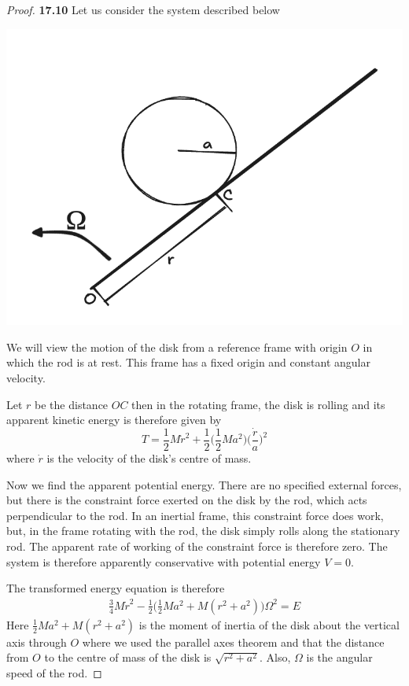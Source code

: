 \documentclass[11pt]{article}
\theoremstyle{definition}
\begin{document}
\begin{proof}{\textbf{17.10}}
    Let us consider the system described below
    \begin{center}
        \includegraphics[scale=0.4]{ch17-10.png}
    \end{center}
    We will view the motion of the disk from a reference frame with origin
    $O$ in which the rod is at rest.
    This frame has a fixed origin and constant angular velocity.
    
    Let $r$ be the distance $OC$ then in the rotating frame, the
    disk is rolling and its apparent kinetic energy is therefore 
    given by
    $$T = \frac{1}{2}M\dot r^2
    + \frac{1}{2}\bigg(\frac{1}{2} M a^2\bigg)\bigg(\frac{\dot r}{a}\bigg)^2$$
    where $\dot r$ is the velocity of the disk's centre of mass.

    Now we find the apparent potential energy. There are no specified external
    forces, but there is the constraint force exerted on the disk by the
    rod, which acts perpendicular to the rod.
    In an inertial frame, this constraint force does work, but, in the frame
    rotating with the rod, the disk simply rolls along the stationary
    rod. The apparent rate of working of the constraint force is therefore
    zero. The system is therefore apparently conservative with potential energy
    $V=0$.

    The transformed energy equation is therefore
    \begin{align*}
        \frac{3}{4}M\dot r^2
        - \frac{1}{2}\bigg(\frac{1}{2}Ma^2 + M(r^2 + a^2)\bigg)\Omega^2 = E 
    \end{align*}
    Here $\frac{1}{2}Ma^2 + M(r^2 + a^2)$ is the moment of inertia of the disk
    about the vertical axis through $O$ where we used the parallel axes theorem
    and that the distance from $O$ to the centre of mass of the disk is
    $\sqrt{r^2 + a^2}$. Also, $\Omega$ is the angular speed of the rod.


\end{proof}
\end{document}
